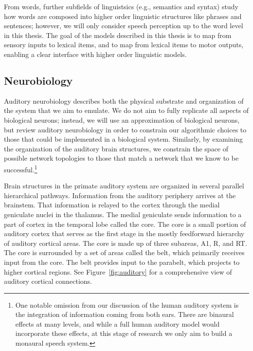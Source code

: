 From words,
further subfields of linguistsics
(e.g., semantics and syntax)
study how words are composed
into higher order linguistic structures
like phrases and sentences;
however, we will only consider
speech perception up to the word level
in this thesis.
The goal of the models described in this thesis
is to map from sensory inputs
to lexical items,
and to map from lexical items to motor outputs,
enabling a clear interface with
higher order linguistic models.

\subsection{Neurobiology}
\label{sec:recog-neurobio}

Auditory neurobiology describes both
the physical substrate and organization
of the system that we aim to emulate.
We do not aim to fully replicate
all aspects of biological neurons;
instead, we will use an approximation
of biological neurons,
but review auditory neurobiology
in order to constrain our algorithmic choices
to those that could be implemented
in a biological system.
Similarly, by examining the organization
of the auditory brain structures,
we constrain the space of possible
network topologies
to those that match
a network that we know
to be successful.\footnote{One notable omission
  from our discussion
  of the human auditory system
  is the integration of information
  coming from both ears.
  There are binaural effects at many levels,
  and while a full human auditory model
  would incorporate these effects,
  at this stage of research
  we only aim to build
  a monaural speech system.}

Brain structures in the primate auditory system
are organized in several parallel
hierarchical pathways.
Information from the auditory periphery
arrives at the brainstem.
That information is relayed to the cortex
through the medial geniculate nuclei
in the thalamus.
The medial geniculate sends information to a part
of cortex in the temporal lobe
called the core.
The core is a small portion of auditory cortex
that serves as the first stage
in the mostly feedforward hierarchy
of auditory cortical areas.
The core is made up of
three subareas, A1, R, and RT.
The core is surrounded by a set of areas
called the belt,
which primarily receives input from
the core.
The belt provides input
to the parabelt,
which projects to higher cortical regions.
See Figure~\ref{fig:auditory}
for a comprehensive view
of auditory cortical connections.


